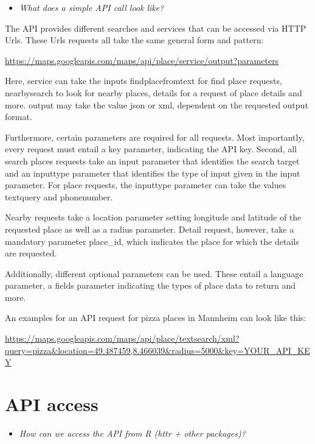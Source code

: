 \documentclass[
]{book}
\providecommand{\tightlist}{%
  \setlength{\itemsep}{0pt}\setlength{\parskip}{0pt}}
\begin{document}
\begin{itemize}
\tightlist
\item
  \emph{What does a simple API call look like?}
\end{itemize}

The API provides different searches and services that can be accessed via HTTP Urls. These Urls requests all take the same general form and pattern:

\url{https://maps.googleapis.com/maps/api/place/service/output?parameters}

Here, service can take the inputs findplacefromtext for find place requests, nearbysearch to look for nearby places, details for a request of place details and more. output may take the value json or xml, dependent on the requested output format.

Furthermore, certain parameters are required for all requests. Most importantly, every request must entail a key parameter, indicating the API key. Second, all search places requests take an input parameter that identifies the search target and an inputtype parameter that identifies the type of input given in the input parameter. For place requests, the inputtype parameter can take the values textquery and phonenumber.

Nearby requests take a location parameter setting longitude and latitude of the requested place as well as a radius parameter. Detail request, however, take a mandatory parameter place\_id, which indicates the place for which the details are requested.

Additionally, different optional parameters can be used. These entail a language parameter, a fields parameter indicating the types of place data to return and more.

An examples for an API request for pizza places in Mannheim can look like this:

\url{https://maps.googleapis.com/maps/api/place/textsearch/xml?query=pizza\&location=49.487459,8.466039\&radius=5000\&key=YOUR_API_KEY}

\hypertarget{api-access-3}{%
\section{API access}\label{api-access-3}}

\begin{itemize}
\tightlist
\item
  \emph{How can we access the API from R (httr + other packages)?}
\end{itemize}
\end{document}
